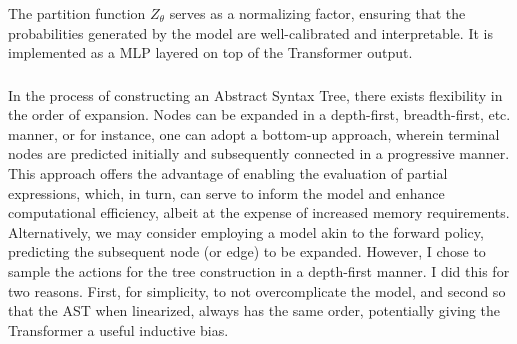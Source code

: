 \subsubsection{}
The partition function $Z_\theta$ serves as a normalizing factor, ensuring that the probabilities generated by the model are well-calibrated and interpretable. It is implemented as a MLP layered on top of the Transformer output.

\subsubsection{}
In the process of constructing an Abstract Syntax Tree, there exists flexibility in the order of expansion. Nodes can be expanded in a depth-first, breadth-first, etc. manner, or for instance, one can adopt a bottom-up approach, wherein terminal nodes are predicted initially and subsequently connected in a progressive manner. This approach offers the advantage of enabling the evaluation of partial expressions, which, in turn, can serve to inform the model and enhance computational efficiency, albeit at the expense of increased memory requirements. Alternatively, we may consider employing a model akin to the forward policy, predicting the subsequent node (or edge) to be expanded.
However, I chose to sample the actions for the tree construction in a depth-first manner. I did this for two reasons. 
First, for simplicity, to not overcomplicate the model, and second so that the AST when linearized, always has the same order, potentially giving the Transformer a useful inductive bias.

